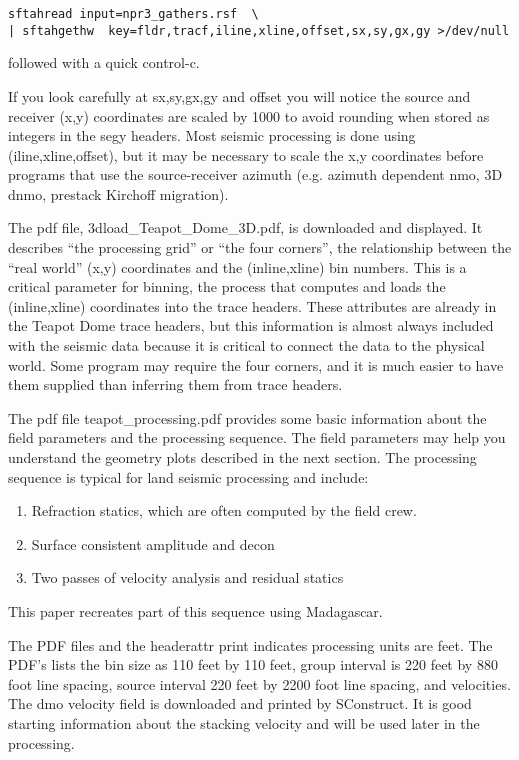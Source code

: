 \begin{verbatim}  
sftahread input=npr3_gathers.rsf  \
| sftahgethw  key=fldr,tracf,iline,xline,offset,sx,sy,gx,gy >/dev/null
\end{verbatim}  

followed with a quick control-c.  

If you look carefully at sx,sy,gx,gy and offset you will notice the source and receiver (x,y) coordinates are scaled by 1000 to avoid rounding when stored as integers in the segy headers.  Most seismic processing is done using (iline,xline,offset), but it may be necessary to scale the x,y coordinates before programs that use the source-receiver azimuth (e.g. azimuth dependent nmo, 3D dnmo, prestack Kirchoff migration).

The pdf file, 3dload\_Teapot\_Dome\_3D.pdf, is downloaded and displayed.  It describes “the processing grid” or “the four corners”, the relationship between the “real world” (x,y) coordinates and the (inline,xline) bin numbers.  This is a critical parameter for binning, the process that computes and loads the (inline,xline) coordinates into the trace headers.  These attributes are already in the Teapot Dome trace headers, but this information is almost always included with the seismic data because it is critical to connect the data to the physical world.  Some program may require the four corners, and it is much easier to have them supplied than inferring them from trace headers.

The pdf file teapot\_processing.pdf provides some basic information about the field parameters and the processing sequence.  The field parameters may help you understand the geometry plots described in the next section.  The processing sequence is typical for land seismic processing and include:
\begin{enumerate}
\item Refraction statics, which are often computed by the field crew.
\item Surface consistent amplitude and decon
\item Two passes of velocity analysis and residual statics
\end{enumerate}

This paper recreates part of this sequence using Madagascar.

The PDF files and the headerattr print indicates processing units are feet.  The PDF’s lists the bin size as 110 feet by 110 feet, group interval is 220 feet by 880 foot line spacing, source interval 220 feet by 2200 foot line spacing, and velocities. The dmo velocity field is downloaded and printed by SConstruct.  It is good starting information about the stacking velocity and will be used later in the processing.

